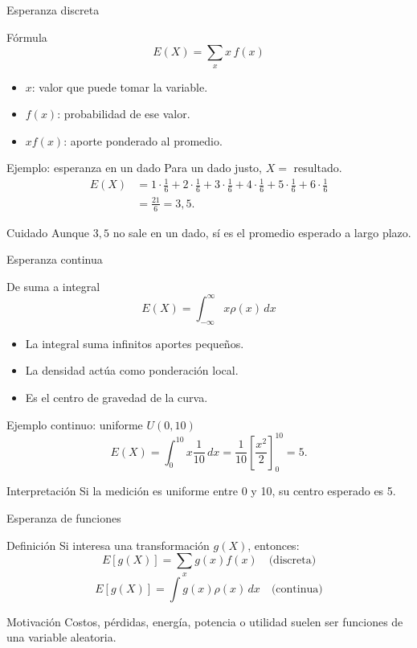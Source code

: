 \documentclass[aspectratio=169,11pt]{beamer}
\begin{document}
\begin{frame}{Esperanza discreta}
\begin{block}{Fórmula}
\[
E(X)=\sum_x x\,f(x)
\]
\end{block}
\begin{itemize}
  \item $x$: valor que puede tomar la variable.
  \item $f(x)$: probabilidad de ese valor.
  \item $x f(x)$: aporte ponderado al promedio.
\end{itemize}
\end{frame}

\begin{frame}{Ejemplo: esperanza en un dado}
\small
Para un dado justo, $X=$ resultado.
\begin{align*}
E(X)&=1\cdot\frac16+2\cdot\frac16+3\cdot\frac16+4\cdot\frac16+5\cdot\frac16+6\cdot\frac16\\
&=\frac{21}{6}=3{,}5.
\end{align*}
\begin{alertblock}{Cuidado}
Aunque $3{,}5$ no sale en un dado, sí es el promedio esperado a largo plazo.
\end{alertblock}
\end{frame}

\begin{frame}{Esperanza continua}
\begin{block}{De suma a integral}
\[
E(X)=\int_{-\infty}^{\infty}x\rho(x)\,dx
\]
\end{block}
\begin{itemize}
  \item La integral suma infinitos aportes pequeños.
  \item La densidad actúa como ponderación local.
  \item Es el centro de gravedad de la curva.
\end{itemize}
\end{frame}

\begin{frame}{Ejemplo continuo: uniforme $U(0,10)$}
\[
E(X)=\int_0^{10}x\frac{1}{10}\,dx
=\frac{1}{10}\left[\frac{x^2}{2}\right]_0^{10}=5.
\]
\begin{exampleblock}{Interpretación}
Si la medición es uniforme entre 0 y 10, su centro esperado es 5.
\end{exampleblock}
\end{frame}

\begin{frame}{Esperanza de funciones}
\begin{block}{Definición}
Si interesa una transformación $g(X)$, entonces:
\[
E[g(X)]=\sum_x g(x)f(x)\quad\text{(discreta)}
\]
\[
E[g(X)]=\int g(x)\rho(x)\,dx\quad\text{(continua)}
\]
\end{block}
\begin{exampleblock}{Motivación}
Costos, pérdidas, energía, potencia o utilidad suelen ser funciones de una variable aleatoria.
\end{exampleblock}
\end{frame}
\end{document}
